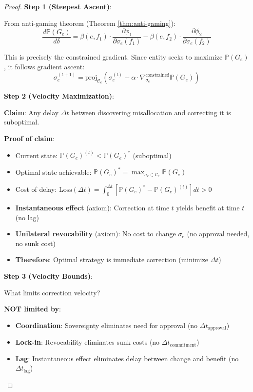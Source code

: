 \documentclass[11pt,a4paper]{article}
\theoremstyle{definition}
\theoremstyle{remark}
\newcommand{\C}{\mathcal{C}}
\begin{document}
\begin{proof}
\textbf{Step 1 (Steepest Ascent)}:

From anti-gaming theorem (Theorem \ref{thm:anti-gaming}):
\[ \frac{d\mathbb{P}(G_e)}{d\delta} = \beta(e,f_1) \cdot \frac{\partial \phi_1}{\partial \sigma_e(f_1)} - \beta(e,f_2) \cdot \frac{\partial \phi_2}{\partial \sigma_e(f_2)} \]

This is precisely the constrained gradient. Since entity seeks to maximize $\mathbb{P}(G_e)$, it follows gradient ascent:
\[ \sigma_e^{(t+1)} = \text{proj}_{\C_e}\left( \sigma_e^{(t)} + \alpha \cdot \nabla_{\sigma_e}^{\text{constrained}} \mathbb{P}(G_e) \right) \]

\textbf{Step 2 (Velocity Maximization)}:

\textbf{Claim}: Any delay $\Delta t$ between discovering misallocation and correcting it is suboptimal.

\textbf{Proof of claim}:
\begin{itemize}
\item Current state: $\mathbb{P}(G_e)^{(t)} < \mathbb{P}(G_e)^*$ (suboptimal)
\item Optimal state achievable: $\mathbb{P}(G_e)^* = \max_{\sigma_e \in \C_e} \mathbb{P}(G_e)$
\item Cost of delay: $\text{Loss}(\Delta t) = \int_0^{\Delta t} \left[ \mathbb{P}(G_e)^* - \mathbb{P}(G_e)^{(t)} \right] dt > 0$
\item \textbf{Instantaneous effect} (axiom): Correction at time $t$ yields benefit at time $t$ (no lag)
\item \textbf{Unilateral revocability} (axiom): No cost to change $\sigma_e$ (no approval needed, no sunk cost)
\item \textbf{Therefore}: Optimal strategy is immediate correction (minimize $\Delta t$)
\end{itemize}

\textbf{Step 3 (Velocity Bounds)}:

What limits correction velocity?

\textbf{NOT limited by}:
\begin{itemize}
\item \textbf{Coordination}: Sovereignty eliminates need for approval (no $\Delta t_{\text{approval}}$)
\item \textbf{Lock-in}: Revocability eliminates sunk costs (no $\Delta t_{\text{commitment}}$)
\item \textbf{Lag}: Instantaneous effect eliminates delay between change and benefit (no $\Delta t_{\text{lag}}$)
\end{itemize}


\end{proof}
\end{document}
